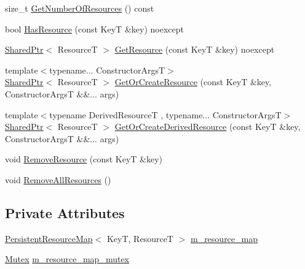 \begin{DoxyCompactItemize}
size\+\_\+t \hyperlink{classmage_1_1_persistent_resource_pool_a16019bc52d2a9eca0d0e239aac4c0566}{Get\+Number\+Of\+Resources} () const
\item 
bool \hyperlink{classmage_1_1_persistent_resource_pool_ad33abfe0eda43b4295ed6b9e7532f3c5}{Has\+Resource} (const KeyT \&key) noexcept
\item 
\hyperlink{namespacemage_a1e01ae66713838a7a67d30e44c67703e}{Shared\+Ptr}$<$ ResourceT $>$ \hyperlink{classmage_1_1_persistent_resource_pool_a1804dd33769dafbb50ebc14231eb793c}{Get\+Resource} (const KeyT \&key) noexcept
\item 
{\footnotesize template$<$typename... Constructor\+ArgsT$>$ }\\\hyperlink{namespacemage_a1e01ae66713838a7a67d30e44c67703e}{Shared\+Ptr}$<$ ResourceT $>$ \hyperlink{classmage_1_1_persistent_resource_pool_a595623bdabb20fd464ca448d7061e9aa}{Get\+Or\+Create\+Resource} (const KeyT \&key, Constructor\+ArgsT \&\&... args)
\item 
{\footnotesize template$<$typename Derived\+ResourceT , typename... Constructor\+ArgsT$>$ }\\\hyperlink{namespacemage_a1e01ae66713838a7a67d30e44c67703e}{Shared\+Ptr}$<$ ResourceT $>$ \hyperlink{classmage_1_1_persistent_resource_pool_a1423605c78293295129fde4afa18637a}{Get\+Or\+Create\+Derived\+Resource} (const KeyT \&key, Constructor\+ArgsT \&\&... args)
\item 
void \hyperlink{classmage_1_1_persistent_resource_pool_ab9f233a5510cf9dc35454b7f3b8b415f}{Remove\+Resource} (const KeyT \&key)
\item 
void \hyperlink{classmage_1_1_persistent_resource_pool_ae8b7a0b7d2f6adefc725d08367b8a29f}{Remove\+All\+Resources} ()
\end{DoxyCompactItemize}
\subsection*{Private Attributes}
\begin{DoxyCompactItemize}
\item 
\hyperlink{namespacemage_a1eb49644c6b3b6a72fa342a7c1f54aed}{Persistent\+Resource\+Map}$<$ KeyT, ResourceT $>$ \hyperlink{classmage_1_1_persistent_resource_pool_a012bb02caf20ff4bcfcfe60331d37310}{m\+\_\+resource\+\_\+map}
\item 
\hyperlink{structmage_1_1_mutex}{Mutex} \hyperlink{classmage_1_1_persistent_resource_pool_acd393008aa9fcebf06daa5ba2b8cc073}{m\+\_\+resource\+\_\+map\+\_\+mutex}
\end{DoxyCompactItemize}


